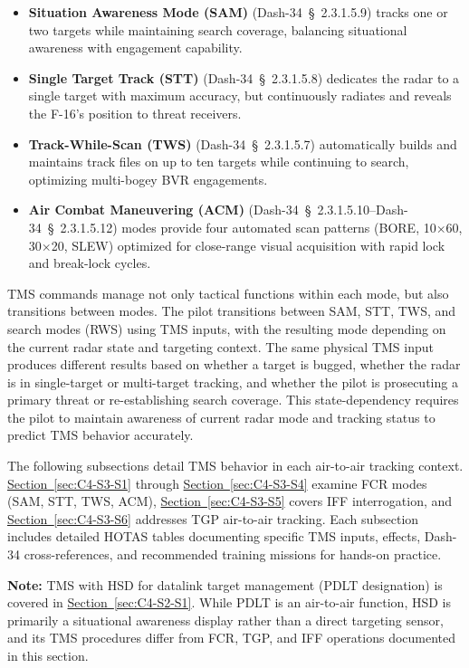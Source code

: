 \documentclass[11pt, a4paper, twoside]{report}
\newcommand{\dashref}[1]{Dash-34~\S~#1}
\newcommand{\secref}[1]{\hyperref[#1]{Section~\ref*{#1}}}
\begin{document}
\begin{itemize}
    \item \textbf{Situation Awareness Mode (SAM)} (\dashref{2.3.1.5.9}) tracks one or two targets while maintaining search coverage, balancing situational awareness with engagement capability.
    
    \item \textbf{Single Target Track (STT)} (\dashref{2.3.1.5.8}) dedicates the radar to a single target with maximum accuracy, but continuously radiates and reveals the F-16's position to threat receivers.
    
    \item \textbf{Track-While-Scan (TWS)} (\dashref{2.3.1.5.7}) automatically builds and maintains track files on up to ten targets while continuing to search, optimizing multi-bogey BVR engagements.
    
    \item \textbf{Air Combat Maneuvering (ACM)} (\dashref{2.3.1.5.10}--\dashref{2.3.1.5.12}) modes provide four automated scan patterns (BORE, 10$\times$60, 30$\times$20, SLEW) optimized for close-range visual acquisition with rapid lock and break-lock cycles.
\end{itemize}

TMS commands manage not only tactical functions within each mode, but also transitions between modes. The pilot transitions between SAM, STT, TWS, and search modes (RWS) using TMS inputs, with the resulting mode depending on the current radar state and targeting context. The same physical TMS input produces different results based on whether a target is bugged, whether the radar is in single-target or multi-target tracking, and whether the pilot is prosecuting a primary threat or re-establishing search coverage. This state-dependency requires the pilot to maintain awareness of current radar mode and tracking status to predict TMS behavior accurately.

The following subsections detail TMS behavior in each air-to-air tracking context. \secref{sec:C4-S3-S1} through \secref{sec:C4-S3-S4} examine FCR modes (SAM, STT, TWS, ACM), \secref{sec:C4-S3-S5} covers IFF interrogation, and \secref{sec:C4-S3-S6} addresses TGP air-to-air tracking. Each subsection includes detailed HOTAS tables documenting specific TMS inputs, effects, Dash-34 cross-references, and recommended training missions for hands-on practice.

\textbf{Note:} TMS with HSD for datalink target management (PDLT designation) is covered in \secref{sec:C4-S2-S1}. While PDLT is an air-to-air function, HSD is primarily a situational awareness display rather than a direct targeting sensor, and its TMS procedures differ from FCR, TGP, and IFF operations documented in this section.
\end{document}
